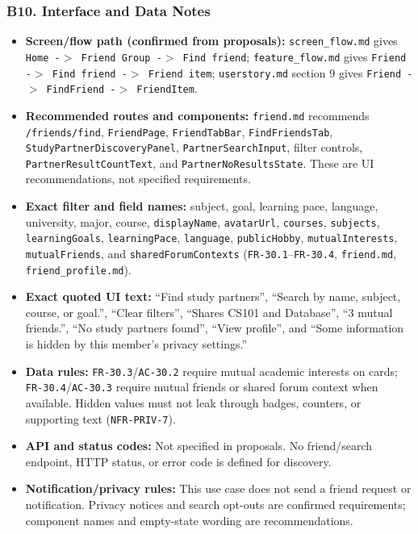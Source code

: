 \documentclass[12pt]{article}
\begin{document}
\hypertarget{sec:b10-interface-and-data-notes}{}
\subsubsection*{B10. Interface and Data Notes}
\par\medskip

\begin{itemize}
\item \textbf{Screen/flow path (confirmed from proposals):} \texttt{screen\_flow.md} gives \texttt{Home -$>$ Friend Group -$>$ Find friend}; \texttt{feature\_flow.md} gives \texttt{Friend -$>$ Find friend -$>$ Friend item}; \texttt{userstory.md} section 9 gives \texttt{Friend -$>$ FindFriend -$>$ FriendItem}.
\item \textbf{Recommended routes and components:} \texttt{friend.md} recommends \texttt{/friends/find}, \texttt{FriendPage}, \texttt{FriendTabBar}, \texttt{FindFriendsTab}, \texttt{StudyPartnerDiscoveryPanel}, \texttt{PartnerSearchInput}, filter controls, \texttt{PartnerResultCountText}, and \texttt{PartnerNoResultsState}. These are UI recommendations, not specified requirements.
\item \textbf{Exact filter and field names:} subject, goal, learning pace, language, university, major, course, \texttt{displayName}, \texttt{avatarUrl}, \texttt{courses}, \texttt{subjects}, \texttt{learningGoals}, \texttt{learningPace}, \texttt{language}, \texttt{publicHobby}, \texttt{mutualInterests}, \texttt{mutualFriends}, and \texttt{sharedForumContexts} (\texttt{FR-30.1}--\texttt{FR-30.4}, \texttt{friend.md}, \texttt{friend\_profile.md}).
\item \textbf{Exact quoted UI text:} “Find study partners”, “Search by name, subject, course, or goal.”, “Clear filters”, “Shares CS101 and Database”, “3 mutual friends.”, “No study partners found”, “View profile”, and “Some information is hidden by this member's privacy settings.”
\item \textbf{Data rules:} \texttt{FR-30.3}/\texttt{AC-30.2} require mutual academic interests on cards; \texttt{FR-30.4}/\texttt{AC-30.3} require mutual friends or shared forum context when available. Hidden values must not leak through badges, counters, or supporting text (\texttt{NFR-PRIV-7}).
\item \textbf{API and status codes:} Not specified in proposals. No friend/search endpoint, HTTP status, or error code is defined for discovery.
\item \textbf{Notification/privacy rules:} This use case does not send a friend request or notification. Privacy notices and search opt-outs are confirmed requirements; component names and empty-state wording are recommendations.
\end{itemize}
\par\medskip
\end{document}
